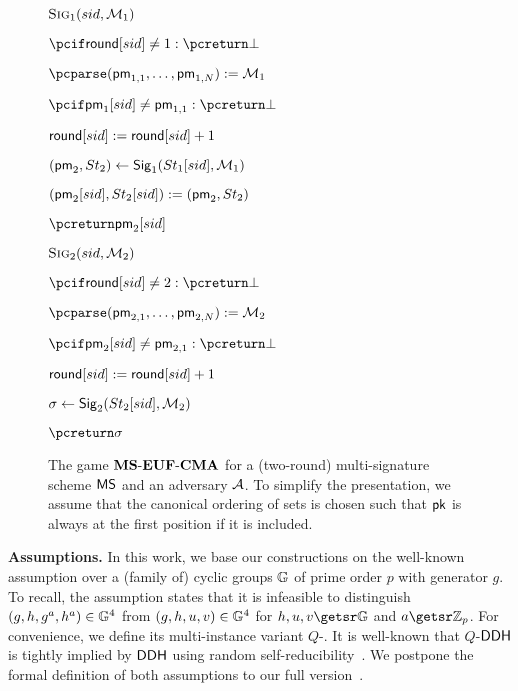 \documentclass[version=final]{iacrcc}
\theoremstyle{mytheorem}				\newtheorem{theorem}{Theorem}
\theoremstyle{myplain}
\theoremstyle{mydefinition}
\theoremstyle{myremark}
\newcommand{\ZZ}{\mathbb{Z}}
\begin{document}
\begin{figure}[h]
{			\begin{minipage}[t]{0.445\textwidth}\underline{\coracle ${\textsc{Sig}}_1(sid,{\mathcal{M}}_1)$}
				\begin{nicodemus}
					\item $\pcif \MapRound[sid]\neq 1: \pcreturn \bot$
					\item $\pcparse (\pm_{1,1},\dots,\pm_{1,N}) := \PMList_1$
					\item $\pcif \pm_1[sid] \neq \pm_{1,1}: \pcreturn \bot$
					\item $\mathsf{round}[sid] := \mathsf{round}[sid] + 1$
					\item $(\mathsf{pm}_2,St_2) \leftarrow {\ensuremath{\mathsf{Sig}}}_1(St_{1}[sid],{\mathcal{M}}_1)$
					\item $(\mathsf{pm}_2[sid],St_2[sid]) := (\mathsf{pm}_2,St_2)$
					\item $\pcreturn \pm_2[sid]$
				\end{nicodemus}
				\medskip \noindent
				\underline{\coracle ${\textsc{Sig}}_2(sid,{\mathcal{M}}_2)$}
				\begin{nicodemus}
					\item $\pcif \MapRound[sid]\neq 2: \pcreturn \bot$
					\item $\pcparse (\pm_{2,1},\dots,\pm_{2,N}) := \PMList_2$
					\item $\pcif \pm_2[sid] \neq \pm_{2,1}: \pcreturn \bot$
					\item $\mathsf{round}[sid] := \mathsf{round}[sid] + 1$
					\item $\sigma \leftarrow {\ensuremath{\mathsf{Sig}}}_2(St_{2}[sid],{\mathcal{M}}_2)$
					\item $\pcreturn \sigma$
				\end{nicodemus}
			\end{minipage}
		}
		\caption{The game $\mathbf{MS\text{-}EUF\text{-}CMA}$ for a (two-round) multi-signature scheme ${\mathsf{MS}}$ and an adversary $\mathcal{A}$. 
		To simplify the presentation, we assume that the canonical ordering of sets is chosen such that ${\mathsf{pk}}$ is always at the first position if it is included.}
		\label{fig:toothpicks:game:ms:securitydef}
\end{figure}

\smallskip\noindent\textbf{Assumptions.}
In this work, we base our constructions on the well-known \ddh assumption over a (family of) cyclic groups ${\mathbb{G}}$ of prime order $p$ with generator $g$.
To recall, the assumption states that it is infeasible to distinguish $(g,h,g^a,h^a) \in {\ensuremath{\mathbb{G}}}^4$ from $(g,h,u,v) \in {\ensuremath{\mathbb{G}}}^4$ for $h,u,v \randfrom \Group$ and $a \randfrom \ZZ_p$.
For convenience, we define its multi-instance variant $Q$-\ddh.
It is well-known that $Q$-$\mathsf{DDH}$ is tightly implied by $\mathsf{DDH}$ using random self-reducibility~\cite{C:EHKRV13}.
\ifnum{}
We postpone the formal definition of both assumptions to our full version~\cite{fullversion}.
\else
\ifnum{}
\end{document}
